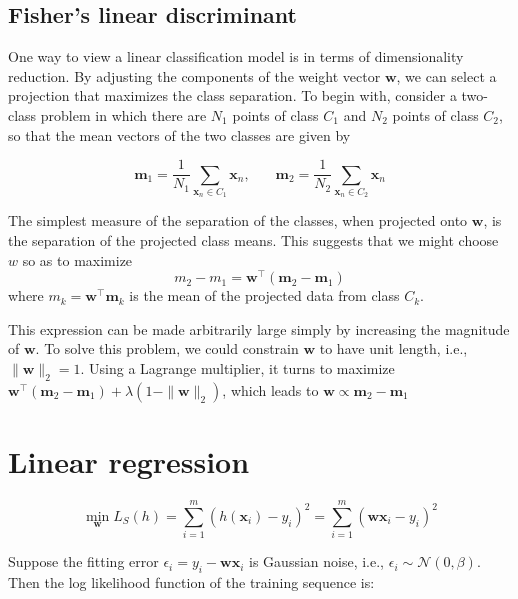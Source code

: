 \documentclass{article}
\begin{document}
	\subsection{Fisher's linear discriminant}
	
	One way to view a linear classification model is in terms of dimensionality reduction. By adjusting the components of the weight vector $\mathbf{w}$, we can select a projection that maximizes the class separation. To begin with, consider a two-class problem in which there are $N_1$ points of class $C_1$ and $N_2$ points of class $C_2$, so that the mean vectors of the two classes are given by

	\begin{equation}
	\mathbf{m}_1 = \frac{1}{N_1} \sum_{\mathbf{x}_n \in C_1} \mathbf{x}_n,\ \ \ \ \ \ \ \ 
	\mathbf{m}_2 = \frac{1}{N_2} \sum_{\mathbf{x}_n \in C_2} \mathbf{x}_n
	\end{equation}
	
	The simplest measure of the separation of the classes, when projected onto $\mathbf{w}$, is the separation of the projected class means. This suggests that we might choose $w$ so as to maximize 
	\begin{equation}
	m_2- m_1=\mathbf{w}^\top (\mathbf{m}_2-\mathbf{m}_1)
	\end{equation}
where $m_k=\mathbf{w}^\top \mathbf{m}_k$ is the mean of the projected data from class $C_k$. 

	This expression can be made arbitrarily large simply by increasing the magnitude of $\mathbf{w}$. To solve this problem, we could constrain $\mathbf{w}$ to have unit length, i.e., $\|\mathbf{w}\|_2=1$. Using a Lagrange multiplier, it turns to maximize $\mathbf{w}^\top (\mathbf{m}_2-\mathbf{m}_1) + \lambda (1-\|\mathbf{w}\|_2)$, which leads to $\mathbf{w}\propto \mathbf{m}_2-\mathbf{m}_1$

\section{Linear regression}

	\begin{equation}
	\min_\mathbf{w} L_S(h) = \sum_{i=1}^m (h(\mathbf{x}_i) - y_i)^2 = \sum_{i=1}^m (\mathbf{wx}_i - y_i)^2 
	\end{equation}

	Suppose the fitting error $\epsilon_i = y_i-\mathbf{wx}_i$ is Gaussian noise, i.e., $\epsilon_i \sim\mathcal{N}(0,\beta)$. Then the log likelihood function of the training sequence is:
	
\end{document}
